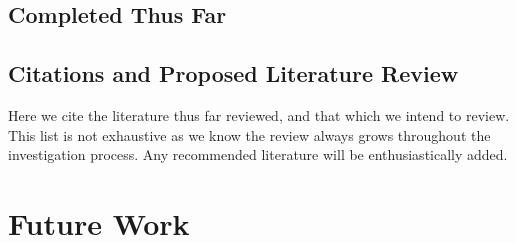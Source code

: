 \documentclass{article}
\begin{document}
\subsection{Completed Thus Far}



\subsection{Citations and Proposed Literature Review}

Here we cite the literature thus far reviewed, and that which we intend to review. This list is not exhaustive as we know the review always grows throughout the investigation process. Any recommended literature will be enthusiastically added.

\nocite{*}



\section{Future Work}





% 
\end{document}

